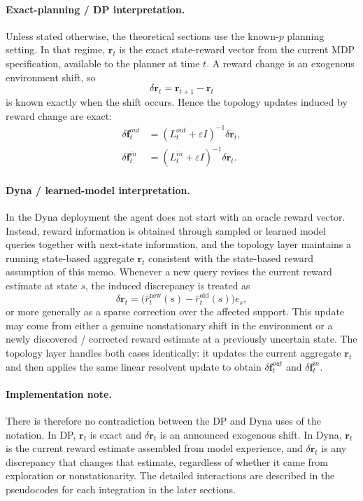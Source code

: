 \documentclass[10pt,a4paper]{article}
\begin{document}
\paragraph{Exact-planning / DP interpretation.}
Unless stated otherwise, the theoretical sections use the known-$p$ planning setting.
In that regime, $\mathbf{r}_t$ is the exact state-reward vector from the current MDP specification, available to the planner at time $t$.  A reward change is an exogenous environment shift, so
\[
  \delta\mathbf{r}_t = \mathbf{r}_{t+1} - \mathbf{r}_t
\]
is known exactly when the shift occurs.  Hence the topology updates induced by reward change are exact:
\[
\begin{aligned}
  \delta\mathbf{f}^{out}_t &= (L^{out}_t+\varepsilon I)^{-1}\delta\mathbf{r}_t, \\
  \delta\mathbf{f}^{in}_t  &= (L^{in}_t+\varepsilon I)^{-1}\delta\mathbf{r}_t.
\end{aligned}
\]

\paragraph{Dyna / learned-model interpretation.}
In the Dyna deployment the agent does not start with an oracle reward vector.  Instead, reward information is obtained through sampled or learned model queries together with next-state information, and the topology layer maintains a running state-based aggregate $\mathbf{r}_t$ consistent with the state-based reward assumption of this memo.
Whenever a new query revises the current reward estimate at state $s$, the induced discrepancy is treated as
\[
  \delta\mathbf{r}_t = \bigl(\widehat r_t^{\mathrm{new}}(s) - \widehat r_t^{\mathrm{old}}(s)\bigr)e_s,
\]
or more generally as a sparse correction over the affected support.
This update may come from either a genuine nonstationary shift in the environment or a newly discovered / corrected reward estimate at a previously uncertain state.
The topology layer handles both cases identically: it updates the current aggregate $\mathbf{r}_t$ and then applies the same linear resolvent update to obtain $\delta\mathbf{f}^{out}_t$ and $\delta\mathbf{f}^{in}_t$.

\paragraph{Implementation note.}
There is therefore no contradiction between the DP and Dyna uses of the notation.
In DP, $\mathbf{r}_t$ is exact and $\delta\mathbf{r}_t$ is an announced exogenous shift.
In Dyna, $\mathbf{r}_t$ is the current reward estimate assembled from model experience, and $\delta\mathbf{r}_t$ is any discrepancy that changes that estimate, regardless of whether it came from exploration or nonstationarity.
The detailed interactions are described in the pseudocodes for each integration in the later sections.
\end{document}

